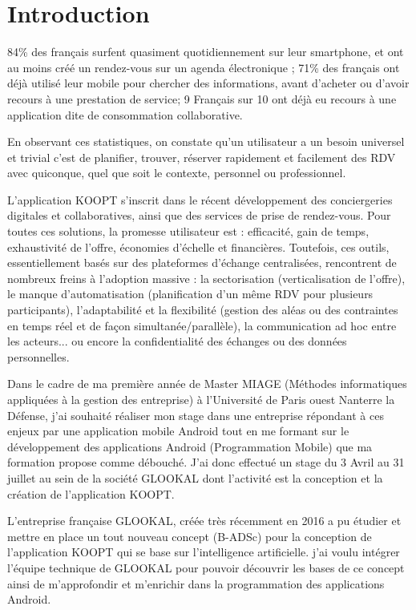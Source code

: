 \chapter*{Introduction}
\label{chap:introduction}

84\% des français surfent quasiment quotidiennement sur leur smartphone, et ont au moins créé un rendez-vous sur un agenda électronique ; 71\% des français ont déjà utilisé leur mobile pour chercher des informations, avant d’acheter ou d’avoir recours à une prestation de service; 9 Français sur 10 ont déjà eu recours à une application dite de consommation collaborative.

En observant ces statistiques, on constate qu’un utilisateur a un besoin universel et trivial c’est de planifier, trouver, réserver rapidement et facilement des RDV avec quiconque, quel que soit le contexte, personnel ou professionnel.


L’application KOOPT s’inscrit dans le récent développement des conciergeries digitales et collaboratives, ainsi que des services de prise de rendez-vous. Pour toutes ces solutions, la promesse utilisateur est : efficacité, gain de temps, exhaustivité de l’offre, économies d’échelle et financières. Toutefois, ces outils, essentiellement basés sur des plateformes d’échange centralisées, rencontrent de nombreux freins à l’adoption massive : la sectorisation (verticalisation de l’offre), le manque d’automatisation (planification d’un même RDV pour plusieurs participants), l’adaptabilité et la flexibilité (gestion des aléas ou des contraintes en temps réel et de façon simultanée/parallèle), la communication ad hoc entre les acteurs... ou encore la confidentialité des échanges ou des données personnelles. 
				
Dans le cadre de ma première année de Master MIAGE (Méthodes informatiques appliquées à la gestion des entreprise) à l'Université de Paris ouest Nanterre la Défense, j'ai souhaité réaliser mon stage dans une entreprise répondant à ces enjeux par une application mobile Android tout en me formant sur le développement des applications Android (Programmation Mobile)  que ma formation propose comme débouché. 					
J'ai donc effectué un stage du 3 Avril au 31 juillet au sein de la société GLOOKAL dont l'activité est la conception et la création de l’application KOOPT. 
				
L'entreprise française GLOOKAL, créée très récemment en 2016 a pu étudier et mettre en place un tout nouveau concept (B-ADSc) pour la conception de l’application KOOPT qui se base sur l’intelligence artificielle. j'ai voulu intégrer l’équipe technique de GLOOKAL pour pouvoir découvrir les bases de ce concept ainsi de m’approfondir et m'enrichir dans la programmation des applications Android. 
 
